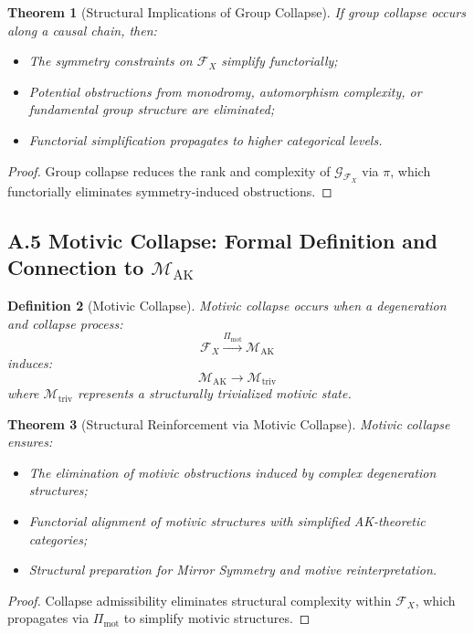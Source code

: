 \documentclass[11pt]{article}
\newtheorem{theorem}{Theorem}[section]
\newtheorem{definition}[theorem]{Definition}
\begin{document}
\begin{theorem}[Structural Implications of Group Collapse]
If group collapse occurs along a causal chain, then:
\begin{itemize}
    \item The symmetry constraints on $\mathcal{F}_X$ simplify functorially;
    \item Potential obstructions from monodromy, automorphism complexity, or fundamental group structure are eliminated;
    \item Functorial simplification propagates to higher categorical levels.
\end{itemize}
\end{theorem}

\begin{proof}
Group collapse reduces the rank and complexity of $\mathcal{G}_{\mathcal{F}_X}$ via $\pi$, which functorially eliminates symmetry-induced obstructions.
\end{proof}

\subsection*{A.5 Motivic Collapse: Formal Definition and Connection to $\mathcal{M}_{\mathrm{AK}}$}

\begin{definition}[Motivic Collapse]
Motivic collapse occurs when a degeneration and collapse process:
\[
\mathcal{F}_X \xrightarrow{\Pi_{\mathrm{mot}}} \mathcal{M}_{\mathrm{AK}}
\]
induces:
\[
\mathcal{M}_{\mathrm{AK}} \longrightarrow \mathcal{M}_{\mathrm{triv}}
\]
where $\mathcal{M}_{\mathrm{triv}}$ represents a structurally trivialized motivic state.
\end{definition}

\begin{theorem}[Structural Reinforcement via Motivic Collapse]
Motivic collapse ensures:
\begin{itemize}
    \item The elimination of motivic obstructions induced by complex degeneration structures;
    \item Functorial alignment of motivic structures with simplified AK-theoretic categories;
    \item Structural preparation for Mirror Symmetry and motive reinterpretation.
\end{itemize}
\end{theorem}

\begin{proof}
Collapse admissibility eliminates structural complexity within $\mathcal{F}_X$, which propagates via $\Pi_{\mathrm{mot}}$ to simplify motivic structures.
\end{proof}
\end{document}
